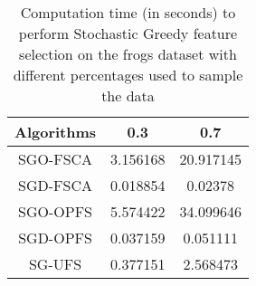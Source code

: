 \begin{table}
	\begin{center}
		\begin{tabular}{c c c}
			Algorithms & 0.3 & 0.7 \\
			\hline
			SGO-FSCA & 3.156168 & 20.917145 \\
			SGD-FSCA & 0.018854 & 0.02378 \\
			SGO-OPFS & 5.574422 & 34.099646 \\
			SGD-OPFS & 0.037159 & 0.051111 \\
			SG-UFS & 0.377151 & 2.568473 \\
		\end{tabular}
	\end{center}
	\caption{Computation time (in seconds) to perform Stochastic Greedy feature selection on the frogs dataset with different percentages used to sample the data}
\end{table}